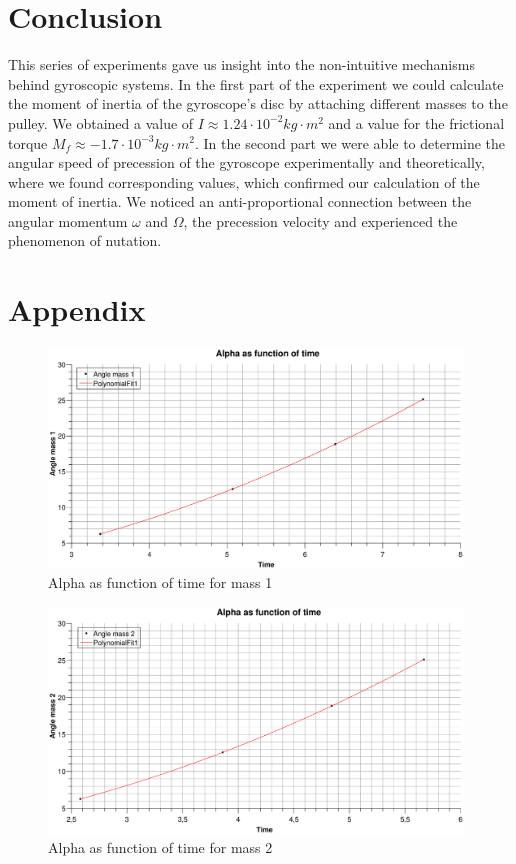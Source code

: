 \documentclass{scrartcl}
\begin{document}
\section{Conclusion}
This series of experiments gave us insight into the non-intuitive mechanisms behind gyroscopic systems.
In the first part of the experiment we could calculate the moment of inertia of the gyroscope's disc by attaching different masses to the pulley. We obtained a value of $I \approx 1.24 \cdot 10^{-2} kg \cdot m^2$ and a value for the frictional torque $M_f \approx -1.7 \cdot 10^{-3} kg \cdot m^2$.
In the second part we were able to determine the angular speed of precession of the gyroscope experimentally and theoretically, where we found corresponding values, which confirmed %
our calculation of the moment of inertia. We noticed an anti-proportional connection between the angular momentum $\omega$ and $\Omega$, the precession velocity and experienced the phenomenon of nutation.

\newpage

\section{Appendix}

    \begin{figure}[h]
        \centering
        \includegraphics[width=11cm]{mass1_AlphaFunctionOfTime.eps}
        \caption{Alpha as function of time for mass 1}
        \label{fig:my_label}
    \end{figure}

    \begin{figure}[h]
        \centering
        \includegraphics[width=11cm]{mass2_AlphaFunctionOfTime.eps}
        \caption{Alpha as function of time for mass 2}
        \label{fig:my_label}
    \end{figure}
    
\end{document}
